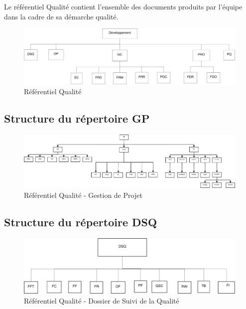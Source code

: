 
Le référentiel Qualité contient l'ensemble des documents produits par l'équipe \nomEquipe{} dans la cadre de sa démarche qualité.

\begin{figure}[ht]
         \begin{center}
         \includegraphics[scale=0.5]{images/arboQualite}
         \end{center}
         \caption{Référentiel Qualité}
 \end{figure}

\clearpage 

\subsection{Structure du répertoire GP}

\begin{figure}[ht]
         \begin{center}
         \includegraphics[scale=0.24]{images/arboGP}
         \end{center}
         \caption{Référentiel Qualité - Gestion de Projet}
 \end{figure}
 
 \subsection{Structure du répertoire DSQ}

\begin{figure}[ht]
         \begin{center}
         \includegraphics[scale=0.5]{images/arboDSQ}
         \end{center}
         \caption{Référentiel Qualité - Dossier de Suivi de la Qualité}
 \end{figure}

